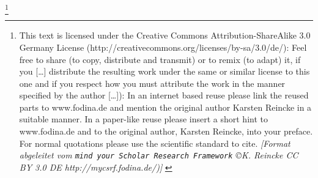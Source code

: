 %
%
%
%

\footnote{This text is licensed under the Creative
Commons Attribution-ShareAlike 3.0 Germany License
(http://creativecommons.org/licenses/by-sa/3.0/de/): Feel free \glqq{}to share
(to copy, distribute and transmit)\grqq{} or \glqq{}to remix (to adapt)\grqq{}
it, if you \glqq{}[\ldots] distribute the resulting work under the same or
similar license to this one\grqq{} and if you respect how \glqq{}you must
attribute the work in the manner specified by the author [\ldots]\grqq{}):
\newline
In an internet based reuse please link the reused parts to www.fodina.de and
mention the original author Karsten Reincke in a suitable manner. In a
paper-like reuse please insert a short hint to www.fodina.de and to the original
author, Karsten Reincke, into your preface. For normal quotations please use the
scientific standard to cite.
\newline
{ \tiny \itshape [Format abgeleitet vom \texttt{mind your Scholar Research
Framework} \copyright K. Reincke CC BY 3.0 DE http://mycsrf.fodina.de/)] }}
